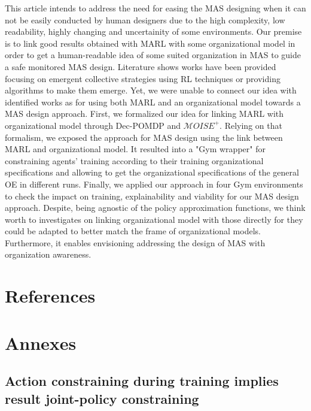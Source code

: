 \documentclass[runningheads]{llncs}
\newcounter{proof}
\begin{document}
This article intends to address the need for easing the MAS designing when it can not be easily conducted by human designers due to the high complexity, low readability, highly changing and uncertainity of some environments. Our premise is to link good results obtained with MARL with some organizational model in order to get a human-readable idea of some suited organization in MAS to guide a safe monitored MAS design. Literature shows works have been provided focusing on emergent collective strategies using RL techniques or providing algorithms to make them emerge. Yet, we were unable to connect our idea with identified works as for using both MARL and an organizational model towards a MAS design approach. First, we formalized our idea for linking MARL with organizational model through Dec-POMDP and $\mathcal{M}OISE^+$. Relying on that formalism, we exposed the approach for MAS design using the link between MARL and organizational model. It resulted into a "Gym wrapper" for constraining agents' training according to their training organizational specifications and allowing to get the organizational specifications of the general OE in different runs. Finally, we applied our approach in four Gym environments to check the impact on training, explainability and viability for our MAS design approach. Despite, being agnostic of the policy approximation functions, we think worth to investigates on linking organizational model with those directly for they could be adapted to better match the frame of organizational models. Furthermore, it enables envisioning addressing the design of MAS with organization awareness.


%
%
%
% 
% 
%
\section*{References}

% 




\newpage

\section*{Annexes}

\subsection*{Action constraining during training implies result joint-policy constraining}

\end{document}
